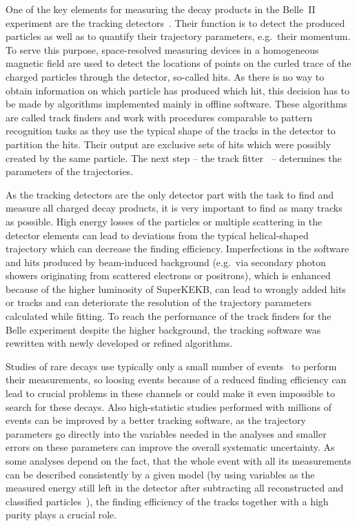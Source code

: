 
One of the key elements for measuring the decay products in the Belle~II experiment are the tracking detectors~\cite{tdr}. Their function is to detect the produced particles as well as to quantify their trajectory parameters, e.g.\ their momentum. To serve this purpose, space-resolved measuring devices in a homogeneous magnetic field are used to detect the locations of points on the curled trace of the charged particles through the detector, so-called hits. As there is no way to obtain information on which particle has produced which hit, this decision has to be made by algorithms implemented mainly in offline software. These algorithms are called track finders and work with procedures comparable to pattern recognition tasks as they use the typical shape of the tracks in the detector to partition the hits. Their output are exclusive sets of hits which were possibly created by the same particle. The next step -- the track fitter~\cite{genfit} -- determines the parameters of the trajectories.

As the tracking detectors are the only detector part with the task to find and measure all charged decay products, it is very important to find as many tracks as possible. High energy losses of the particles or multiple scattering in the detector elements can lead to deviations from the typical helical-shaped trajectory which can decrease the finding efficiency. Imperfections in the software and hits produced by beam-induced background (e.g.\ via secondary photon showers originating from scattered electrons or positrons), which is enhanced because of the higher luminosity of SuperKEKB, can lead to wrongly added hits or tracks and can deteriorate the resolution of the trajectory parameters calculated while fitting. To reach the performance of the track finders for the Belle experiment despite the higher background, the tracking software was rewritten with newly developed or refined algorithms.

Studies of rare decays use typically only a small number of events~\cite{lutz} to perform their measurements, so loosing events because of a reduced finding efficiency can lead to crucial problems in these channels or could make it even impossible to search for these decays. Also high-statistic studies performed with millions of events can be improved by a better tracking software, as the trajectory parameters go directly into the variables needed in the analyses and smaller errors on these parameters can improve the overall systematic uncertainty. As some analyses depend on the fact, that the whole event with all its measurements can be described consistently by a given model (by using variables as the measured energy still left in the detector after subtracting all reconstructed and classified particles~\cite{christian_phd}), the finding efficiency of the tracks together with a high purity plays a crucial role.

